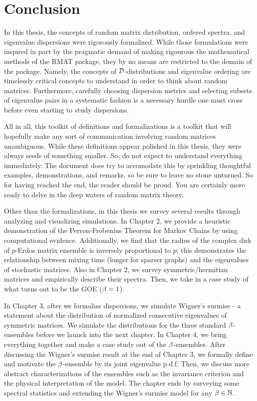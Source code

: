 
  \chapter*{Conclusion}

\medskip

In this thesis, the concepts of random matrix distribution, ordered spectra, and eigenvalue dispersions were rigorously formalized.
While those formulations were inspired in part by the pragmatic demand of making rigourous the mathematical methods of the RMAT package, they by no means are restricted to the domain of the package.
Namely, the concepts of $\mathcal{D}$-distributions and eigenvalue ordering are timelessly critical concepts to understand in order to think about random matrices.
Furthermore, carefully choosing dispersion metrics and selecting subsets of eigenvalue pairs in a systematic fashion is a necessary hurdle one must cross before even starting to study dispersions.

All in all, this toolkit of definitions and formalizations is a toolkit that will hopefully make any sort of communication involving random matrices unambiguous.
While these definitions appear polished in this thesis, they were always seeds of something smaller.
So, do not expect to understand everything immediately.
The document does try to accomodate this by sprinkling thoughtful examples, demonstrations, and remarks, so be sure to leave no stone unturned.
So for having reached the end, the reader should be proud. You are certainly more ready to delve in the deep waters of random matrix theory.

Other than the formalizations, in this thesis we survey several results through analyzing and visualizing simulations.
In Chapter 2, we provide a heuristic demonstration of the Perron-Frobenius Theorem for Markov Chains by using computational evidence.
Additionally, we find that the radius of the complex disk of $p$-Erdos matrix ensemble is inversely proportional to $p$;
this demonstrates the relationship between mixing time (longer for sparser graphs) and the eigenvalues of stochastic matrices.
Also in Chapter 2, we survey symmetric/hermitian matrices and empirically describe their spectra.
Then, we take in a case study of what turns out to be the GOE ($\beta = 1$).

In Chapter 3, after we formalize dispersions, we simulate Wigner's surmise - a statement about the distribution of normalized consecutive eigenvalues of symmetric matrices.
We simulate the distributions for the three standard $\beta$-ensembles before we launch into the next chapter. In Chapter 4, we bring everything together and make a case study out of the $\beta$-ensembles. After discussing the Wigner's surmise result at the end of Chapter 3, we formally define and motivate the $\beta$-ensemble by its joint eigenvalue p.d.f. Then, we discuss more abstract characterizations of the ensembles such as the invariance criterion and the physical interpretation of the model. The chapter ends by surveying some spectral statistics and extending the Wigner's surmise model for any $\beta \in \mathbb{N}$.

